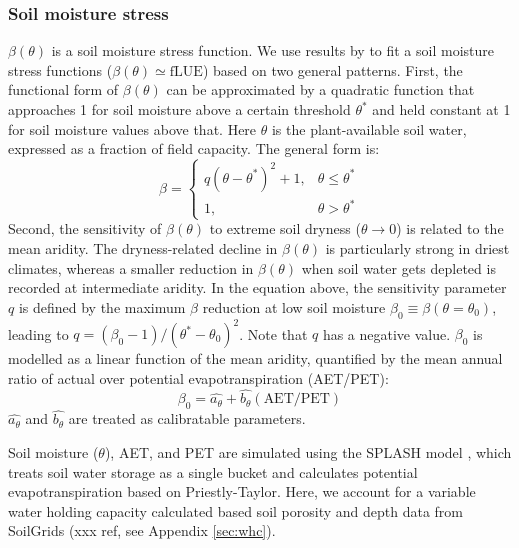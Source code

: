 \documentclass{myreport}
\begin{document}
\subsubsection{Soil moisture stress}
\label{sec:soilmstress}
$\beta(\theta)$ is a soil moisture stress function. We use results by \cite{stocker18newphyt} to fit a soil moisture stress functions ($\beta(\theta)\simeq\text{fLUE}$) based on two general patterns. First, the functional form of $\beta(\theta)$ can be approximated by a quadratic function that approaches 1 for soil moisture above a certain threshold $\theta^{\ast}$ and held constant at 1 for soil moisture values above that. Here $\theta$ is the plant-available soil water, expressed as a fraction of field capacity. The general form is:
\begin{equation}
\label{eq:soilmstress}
    \beta =
\begin{cases}
    q(\theta - \theta^{\ast})^2 + 1,& \theta \leq \theta^{\ast}\\
    1,              & \theta > \theta^{\ast}
\end{cases}
\end{equation}
Second, the sensitivity of $\beta(\theta)$ to extreme soil dryness ($\theta \rightarrow 0$) is related to the mean aridity. The dryness-related decline in $\beta(\theta)$ is particularly strong in driest climates, whereas a smaller reduction in $\beta(\theta)$ when soil water gets depleted is recorded at intermediate aridity. In the equation above, the sensitivity parameter $q$ is defined by the maximum $\beta$ reduction at low soil moisture $\beta_0\equiv\beta(\theta=\theta_0)$, leading to $q=(\beta_0-1)/(\theta^{\ast}-\theta_0)^2$. Note that $q$ has a negative value. $\beta_0$ is modelled as a linear function of the mean aridity, quantified by the mean annual ratio of actual over potential evapotranspiration (AET/PET):
\begin{equation}
\label{eq:soilmsensitivity}
\beta_0 = \widehat{a_{\theta}} + \widehat{b_{\theta}} (\text{AET}/\text{PET})
\end{equation}
$\widehat{a_{\theta}}$ and $\widehat{b_{\theta}}$ are treated as calibratable parameters. 

Soil moisture ($\theta$), AET, and PET are simulated using the SPLASH model \cite{davis17}, which treats soil water storage as a single bucket and calculates potential evapotranspiration based on Priestly-Taylor. Here, we account for a variable water holding capacity calculated based soil porosity and depth data from SoilGrids (xxx ref, see Appendix \ref{sec:whc}).
\end{document}
